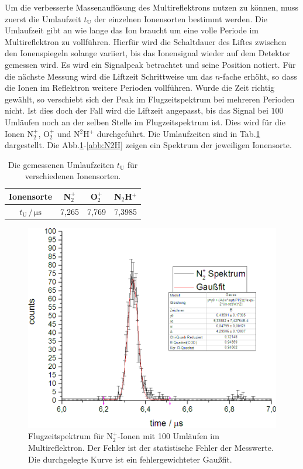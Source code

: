 \documentclass[numbers=noenddot,a4paper,notitlepage,twoside,BCOR15mm]{scrartcl}
\begin{document}
		Um die verbesserte Massenauflösung des Multireflektrons nutzen zu können, muss zuerst die Umlaufzeit $t_\mathrm{U}$ der einzelnen Ionensorten bestimmt werden. Die Umlaufzeit gibt an wie lange das Ion braucht um eine volle Periode im Multireflektron zu vollführen. Hierfür wird die Schaltdauer des Liftes zwischen den Ionenspiegeln solange variiert, bis das Ionensignal wieder auf dem Detektor gemessen wird. Es wird ein Signalpeak betrachtet und seine Position notiert. Für die nächste Messung wird die Liftzeit Schrittweise um das $n$-fache erhöht, so dass die Ionen im Reflektron weitere Perioden vollführen. Wurde die Zeit richtig gewählt, so verschiebt sich der Peak im Flugzeitspektrum bei mehreren Perioden nicht. Ist dies doch der Fall wird die Liftzeit angepasst, bis das Signal bei $100$ Umläufen noch an der selben Stelle im Flugzeitspektrum ist. Dies wird für die Ionen N$_2^+$, O$_2^+$ und N$^2$H$^+$ durchgeführt. Die Umlaufzeiten sind in Tab.\ref{tab:umlauf} dargestellt. Die Abb.\ref{abb:N2}-\ref{abb:N2H} zeigen ein Spektrum der jeweiligen Ionensorte.
		
		\begin{table}[h]
			\centering
			\caption{Die gemessenen Umlaufzeiten $t_\mathrm{U}$ für verschiedenen Ionensorten.}
			\begin{tabular}{c|c c c}
				Ionensorte & N$_2^+$ & O$_2^+$ & N$_2$H$^+$  \\ \hline
				$t_\mathrm{U}\, /\,\mathrm{\mu s}$ & 7,265 & 7,769 & 7,3985 \\ 
			\end{tabular}
			\label{tab:umlauf}
		\end{table}
		
				\begin{figure}[h]
					\centering
					\includegraphics[width=0.6\columnwidth]{pics/N2}
					\caption{Flugzeitspektrum für N${}_2^+$-Ionen mit 100 Umläufen im Multireflektron. Der Fehler ist der statistische Fehler der Messwerte. Die durchgelegte Kurve ist ein fehlergewichteter Gaußfit.}
					\label{abb:N2}
				\end{figure}
				
\end{document}
